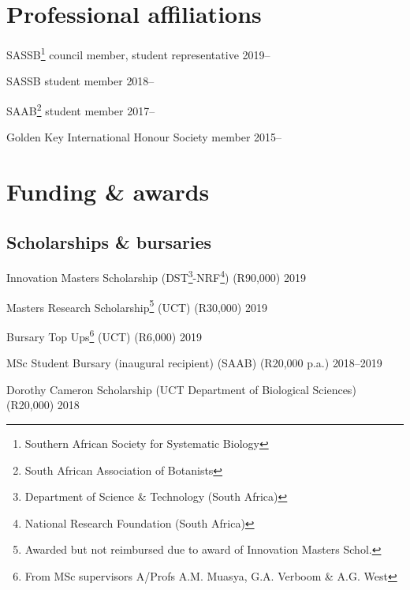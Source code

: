\documentclass[10pt]{article}
\begin{document}


\bigskip

\section*{Professional affiliations} %

SASSB\footnote{Southern African Society for Systematic Biology} council member, 
student representative                                    \hfill {\small 2019--}

SASSB student member                                      \hfill {\small 2018--}

SAAB\footnote{South African Association of Botanists} student member
                                                          \hfill {\small 2017--}

Golden Key International Honour Society member            \hfill {\small 2015--}

\section*{Funding \& awards} %

\subsection*{Scholarships \& bursaries}

Innovation Masters Scholarship (DST\footnote{Department of Science \&
Technology (South Africa)}-NRF\footnote{National Research Foundation (South 
Africa)}) (R90,000)                                         \hfill {\small 2019}

Masters Research Scholarship\footnote{Awarded but not reimbursed due to award 
of Innovation Masters Schol.} (UCT) (R30,000)               \hfill {\small 2019}

Bursary Top Ups\footnote{From MSc supervisors A/Profs A.M. Muasya, G.A. Verboom 
\& A.G. West} (UCT) (R6,000)                                \hfill {\small 2019}

MSc Student Bursary (inaugural recipient) (SAAB) (R20,000 p.a.)
                                                      \hfill {\small 2018--2019}

Dorothy Cameron Scholarship (UCT Department of Biological Sciences) (R20,000)
                                                            \hfill {\small 2018}
\end{document}
